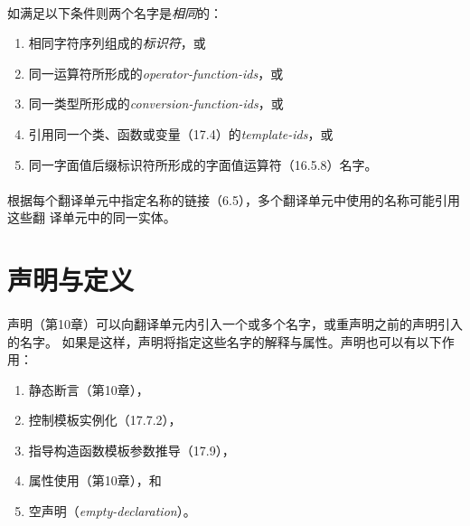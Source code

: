\paragraph{}
如满足以下条件则两个名字是\textit{相同}的：
\begin{enumerate}
  \item{相同字符序列组成的\textit{标识符}，或}
  \item{同一运算符所形成的\textit{operator-function-ids}，或}
  \item{同一类型所形成的\textit{conversion-function-ids}，或}
  \item{引用同一个类、函数或变量（17.4）的\textit{template-ids}，或}
  \item{同一字面值后缀标识符所形成的字面值运算符（16.5.8）名字。}
\end{enumerate}

\paragraph{}
根据每个翻译单元中指定名称的链接（6.5），多个翻译单元中使用的名称可能引用这些翻
译单元中的同一实体。


\section{声明与定义}

\paragraph{}
声明（第10章）可以向翻译单元内引入一个或多个名字，或重声明之前的声明引入的名字。
如果是这样，声明将指定这些名字的解释与属性。声明也可以有以下作用：
\begin{enumerate}
  \item{静态断言（第10章），}
  \item{控制模板实例化（17.7.2），}
  \item{指导构造函数模板参数推导（17.9），}
  \item{属性使用（第10章），和}
  \item{空声明（\textit{empty-declaration}）。}
\end{enumerate}

